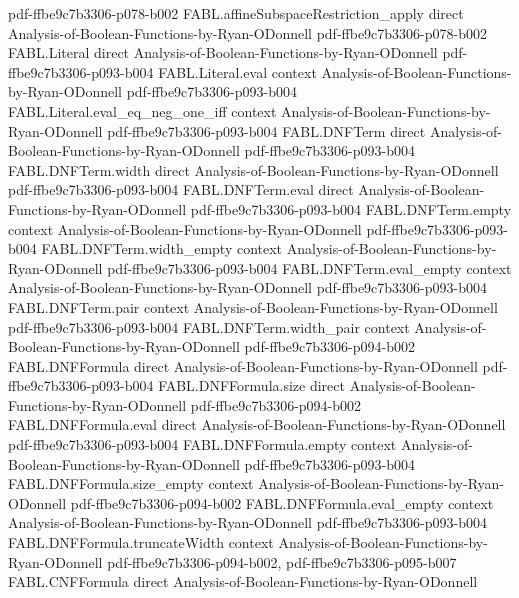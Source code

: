\begin{theorem}
{    pdf-ffbe9c7b3306-p078-b002}
\proofstep
  {FABL.affineSubspaceRestriction_apply}
  {direct}
  {Analysis-of-Boolean-Functions-by-Ryan-ODonnell}
  {pdf-ffbe9c7b3306-p078-b002}
\proofstep
  {FABL.Literal}
  {direct}
  {Analysis-of-Boolean-Functions-by-Ryan-ODonnell}
  {pdf-ffbe9c7b3306-p093-b004}
\proofstep
  {FABL.Literal.eval}
  {context}
  {Analysis-of-Boolean-Functions-by-Ryan-ODonnell}
  {pdf-ffbe9c7b3306-p093-b004}
\proofstep
  {FABL.Literal.eval_eq_neg_one_iff}
  {context}
  {Analysis-of-Boolean-Functions-by-Ryan-ODonnell}
  {pdf-ffbe9c7b3306-p093-b004}
\proofstep
  {FABL.DNFTerm}
  {direct}
  {Analysis-of-Boolean-Functions-by-Ryan-ODonnell}
  {pdf-ffbe9c7b3306-p093-b004}
\proofstep
  {FABL.DNFTerm.width}
  {direct}
  {Analysis-of-Boolean-Functions-by-Ryan-ODonnell}
  {pdf-ffbe9c7b3306-p093-b004}
\proofstep
  {FABL.DNFTerm.eval}
  {direct}
  {Analysis-of-Boolean-Functions-by-Ryan-ODonnell}
  {pdf-ffbe9c7b3306-p093-b004}
\proofstep
  {FABL.DNFTerm.empty}
  {context}
  {Analysis-of-Boolean-Functions-by-Ryan-ODonnell}
  {pdf-ffbe9c7b3306-p093-b004}
\proofstep
  {FABL.DNFTerm.width_empty}
  {context}
  {Analysis-of-Boolean-Functions-by-Ryan-ODonnell}
  {pdf-ffbe9c7b3306-p093-b004}
\proofstep
  {FABL.DNFTerm.eval_empty}
  {context}
  {Analysis-of-Boolean-Functions-by-Ryan-ODonnell}
  {pdf-ffbe9c7b3306-p093-b004}
\proofstep
  {FABL.DNFTerm.pair}
  {context}
  {Analysis-of-Boolean-Functions-by-Ryan-ODonnell}
  {pdf-ffbe9c7b3306-p093-b004}
\proofstep
  {FABL.DNFTerm.width_pair}
  {context}
  {Analysis-of-Boolean-Functions-by-Ryan-ODonnell}
  {pdf-ffbe9c7b3306-p094-b002}
\proofstep
  {FABL.DNFFormula}
  {direct}
  {Analysis-of-Boolean-Functions-by-Ryan-ODonnell}
  {pdf-ffbe9c7b3306-p093-b004}
\proofstep
  {FABL.DNFFormula.size}
  {direct}
  {Analysis-of-Boolean-Functions-by-Ryan-ODonnell}
  {pdf-ffbe9c7b3306-p094-b002}
\proofstep
  {FABL.DNFFormula.eval}
  {direct}
  {Analysis-of-Boolean-Functions-by-Ryan-ODonnell}
  {pdf-ffbe9c7b3306-p093-b004}
\proofstep
  {FABL.DNFFormula.empty}
  {context}
  {Analysis-of-Boolean-Functions-by-Ryan-ODonnell}
  {pdf-ffbe9c7b3306-p093-b004}
\proofstep
  {FABL.DNFFormula.size_empty}
  {context}
  {Analysis-of-Boolean-Functions-by-Ryan-ODonnell}
  {pdf-ffbe9c7b3306-p094-b002}
\proofstep
  {FABL.DNFFormula.eval_empty}
  {context}
  {Analysis-of-Boolean-Functions-by-Ryan-ODonnell}
  {pdf-ffbe9c7b3306-p093-b004}
\proofstep
  {FABL.DNFFormula.truncateWidth}
  {context}
  {Analysis-of-Boolean-Functions-by-Ryan-ODonnell}
  {pdf-ffbe9c7b3306-p094-b002,
    pdf-ffbe9c7b3306-p095-b007}
\proofstep
  {FABL.CNFFormula}
  {direct}
  {Analysis-of-Boolean-Functions-by-Ryan-ODonnell}

\end{theorem}
